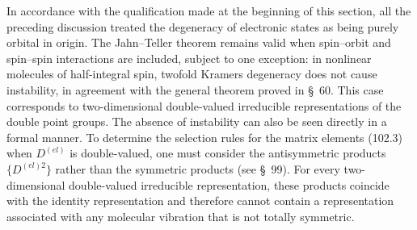 In accordance with the qualification made at the beginning of this section, all the preceding discussion treated the degeneracy of electronic states as being purely orbital in origin. The Jahn--Teller theorem remains valid when spin--orbit and spin--spin interactions are included, subject to one exception: in nonlinear molecules of half-integral spin, twofold Kramers degeneracy does not cause instability, in agreement with the general theorem proved in \S~60. This case corresponds to two-dimensional double-valued irreducible representations of the double point groups. The absence of instability can also be seen directly in a formal manner. To determine the selection rules for the matrix elements (102.3) when $D^{(el)}$ is double-valued, one must consider the antisymmetric products $\{D^{(el)2}\}$ rather than the symmetric products (see \S~99). For every two-dimensional double-valued irreducible representation, these products coincide with the identity representation and therefore cannot contain a representation associated with any molecular vibration that is not totally symmetric.
